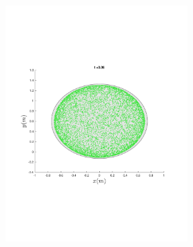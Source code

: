 \begin{figure}
{\begin{subfigure}{0.5\textwidth}
\begin{subfigure}[b]{0.5\textwidth}
        \includegraphics[trim={1cm 7cm 1cm 7cm},
        width=\textwidth]{figures/method/FunnelSimOverlaid9funnel-1}
      \end{subfigure}%
      \\
      \begin{subfigure}[b]{0.5\textwidth}

\end{subfigure}
\end{subfigure}}
\end{figure}
